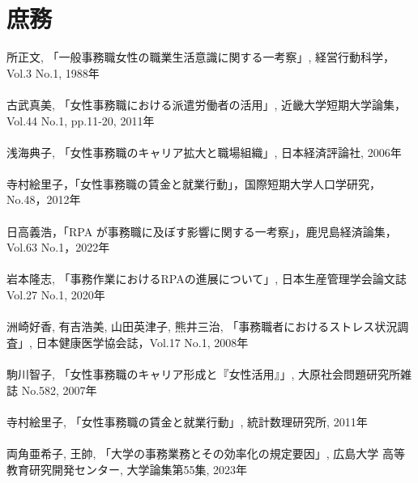 \section*{庶務}
所正文, 「一般事務職女性の職業生活意識に関する一考察」, 経営行動科学，Vol.3 No.1, 1988年
\\\\
古武真美, 「女性事務職における派遣労働者の活用」, 近畿大学短期大学論集，Vol.44 No.1, pp.11-20, 2011年
\\\\
浅海典子, 「女性事務職のキャリア拡大と職場組織」, 日本経済評論社, 2006年
\\\\
寺村絵里子，「女性事務職の賃金と就業行動」，国際短期大学人口学研究，No.48，2012年
\\\\
日高義浩，「RPA が事務職に及ぼす影響に関する一考察」，鹿児島経済論集，Vol.63 No.1，2022年
\\\\
岩本隆志, 「事務作業におけるRPAの進展について」, 日本生産管理学会論文誌Vol.27 No.1, 2020年
\\\\
洲崎好香, 有吉浩美, 山田英津子, 熊井三治, 「事務職者におけるストレス状況調査」, 日本健康医学協会誌，Vol.17 No.1, 2008年
\\\\
駒川智子, 「女性事務職のキャリア形成と『女性活用』」, 大原社会問題研究所雑誌 No.582, 2007年
\\\\
寺村絵里子, 「女性事務職の賃金と就業行動」, 統計数理研究所, 2011年
\\\\
両角亜希子, 王帥, 「大学の事務業務とその効率化の規定要因」, 広島大学 高等教育研究開発センター, 大学論集第55集, 2023年

\clearpage
